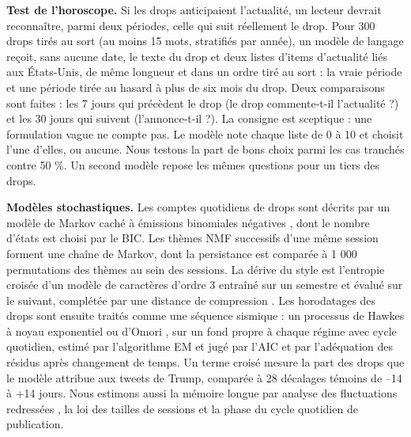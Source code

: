 \documentclass[11pt,a4paper]{article}
\begin{document}
\textbf{Test de l'horoscope.} Si les drops anticipaient l'actualité, un lecteur devrait reconnaître, parmi deux périodes, celle qui suit réellement le drop. Pour 300 drops tirés au sort (au moins 15 mots, stratifiés par année), un modèle de langage reçoit, sans aucune date, le texte du drop et deux listes d'items d'actualité liés aux États-Unis, de même longueur et dans un ordre tiré au sort : la vraie période et une période tirée au hasard à plus de six mois du drop. Deux comparaisons sont faites : les 7 jours qui précèdent le drop (le drop commente-t-il l'actualité ?) et les 30 jours qui suivent (l'annonce-t-il ?). La consigne est sceptique : une formulation vague ne compte pas. Le modèle note chaque liste de 0 à 10 et choisit l'une d'elles, ou aucune. Nous testons la part de bons choix parmi les cas tranchés contre 50 \%. Un second modèle repose les mêmes questions pour un tiers des drops.

\textbf{Modèles stochastiques.} Les comptes quotidiens de drops sont décrits par un modèle de Markov caché à émissions binomiales négatives \parencite{rabiner1989tutorial}, dont le nombre d'états est choisi par le BIC. Les thèmes NMF successifs d'une même session forment une chaîne de Markov, dont la persistance est comparée à 1 000 permutations des thèmes au sein des sessions. La dérive du style est l'entropie croisée d'un modèle de caractères d'ordre 3 entraîné sur un semestre et évalué sur le suivant, complétée par une distance de compression \parencite{benedetto2002language}. Les horodatages des drops sont ensuite traités comme une séquence sismique : un processus de Hawkes \parencite{hawkes1971spectra} à noyau exponentiel ou d'Omori \parencite{ogata1988statistical}, sur un fond propre à chaque régime avec cycle quotidien, estimé par l'algorithme EM \parencite{veen2008estimation} et jugé par l'AIC et par l'adéquation des résidus après changement de temps. Un terme croisé mesure la part des drops que le modèle attribue aux tweets de Trump, comparée à 28 décalages témoins de –14 à +14 jours. Nous estimons aussi la mémoire longue par analyse des fluctuations redressées \parencite{peng1994mosaic}, la loi des tailles de sessions \parencite{clauset2009powerlaw,vuong1989likelihood} et la phase du cycle quotidien de publication.
\end{document}
